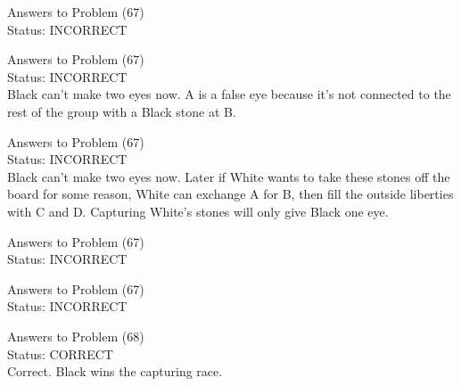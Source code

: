\documentclass[11pt]{article}
\begin{document}
\begin{minipage}[t]{0.5\textwidth}
  {\centering
  
  Answers to Problem (67)\\
  Status: INCORRECT\\
  
  }
\end{minipage}
\begin{minipage}[t]{0.5\textwidth}
  {\centering
  
  Answers to Problem (67)\\
  Status: INCORRECT\\
  Black can't make two eyes now. A is a false eye because it's not connected to the rest of the group with a Black stone at B.\\
  }
\end{minipage}
\begin{minipage}[t]{0.5\textwidth}
  {\centering
  
  Answers to Problem (67)\\
  Status: INCORRECT\\
  Black can't make two eyes now. Later if White wants to take these stones off the board for some reason, White can exchange A for B, then fill the outside liberties with C and D. Capturing White's stones will only give Black one eye.\\
  }
\end{minipage}
\begin{minipage}[t]{0.5\textwidth}
  {\centering
  
  Answers to Problem (67)\\
  Status: INCORRECT\\
  
  }
\end{minipage}
\begin{minipage}[t]{0.5\textwidth}
  {\centering
  
  Answers to Problem (67)\\
  Status: INCORRECT\\
  
  }
\end{minipage}
\begin{minipage}[t]{0.5\textwidth}
  {\centering
  
  Answers to Problem (68)\\
  Status: CORRECT\\
  Correct. Black wins the capturing race.\\
  }
\end{minipage}
\end{document}
